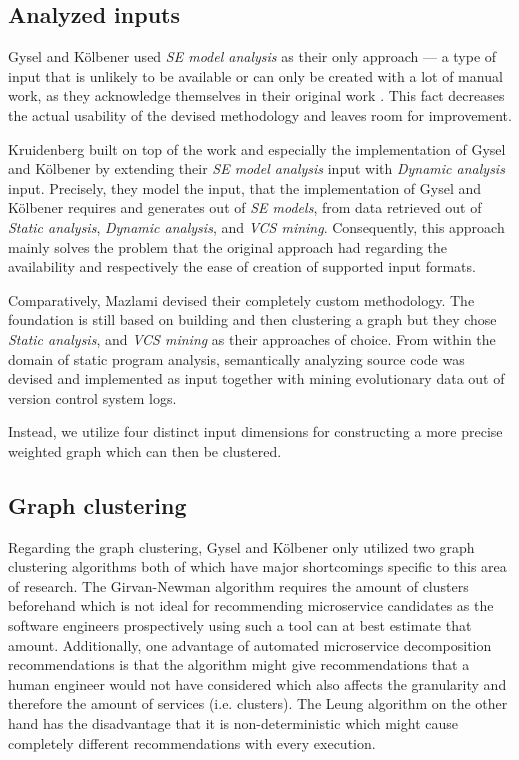 \documentclass[12pt,a4paper]{report}
\begin{document}
\subsection{Analyzed inputs}

Gysel and K{\"o}lbener used \textit{SE model analysis} as their only approach ---
a type of input that is unlikely to be available or can only
be created with a lot of manual work, as they acknowledge
themselves in their original work \cite{gysel2016service}.
This fact decreases the actual usability of the devised methodology and leaves
room for improvement.

Kruidenberg \cite{kruidenberg2018monoliths} built on top of the work and
especially the implementation of Gysel and K{\"o}lbener by extending their
\textit{SE model analysis} input with \textit{Dynamic analysis} input.
Precisely, they model the input, that the implementation of Gysel and K{\"o}lbener
requires and generates out of \textit{SE models}, from data retrieved
out of \textit{Static analysis}, \textit{Dynamic analysis}, and \textit{VCS mining}.
Consequently, this approach mainly solves the problem that the original approach
had regarding the availability and respectively the ease of creation
of supported input formats.

Comparatively, Mazlami \cite{mazlami2017extraction} devised their completely
custom methodology. The foundation is still based on building and then clustering
a graph but they chose \textit{Static analysis}, and \textit{VCS mining} as
their approaches of choice. From within the domain of static program analysis,
semantically analyzing source code was devised and implemented as input together
with mining evolutionary data out of version control system logs.

Instead, we utilize four distinct input dimensions for constructing
a more precise weighted graph which can then be clustered.


\subsection{Graph clustering}

Regarding the graph clustering, Gysel and K{\"o}lbener \cite{gysel2016service}
only utilized two graph clustering algorithms both of which have major
shortcomings specific to this area of research.
The Girvan-Newman algorithm \cite{girvan2002community} requires the
amount of clusters beforehand which is not ideal for recommending
microservice candidates as the software engineers prospectively using
such a tool can at best estimate that amount.
Additionally, one advantage of automated microservice decomposition recommendations
is that the algorithm might give recommendations that a human engineer would
not have considered which also affects the granularity and therefore the
amount of services (i.e. clusters).
The Leung algorithm \cite{leung2009community} on the other hand has the
disadvantage that it is non\hyp deterministic which might cause completely
different recommendations with every execution.
\end{document}
